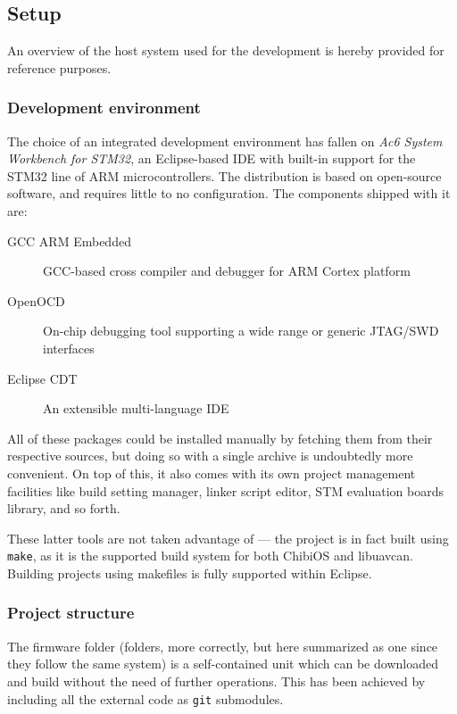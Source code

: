 \subsection{Setup}\label{subsec:sw_setup}
An overview of the host system used for the development is hereby provided for reference purposes.



\subsubsection{Development environment}
The choice of an integrated development environment has fallen on \emph{Ac6 System Workbench for STM32}, an Eclipse-based IDE with built-in support for the STM32 line of ARM microcontrollers.
The distribution is based on open-source software, and requires little to no configuration.
The components shipped with it are:
\begin{description}
    \item[GCC ARM Embedded] GCC-based cross compiler and debugger for ARM Cortex platform
    \item[OpenOCD] On-chip debugging tool supporting a wide range or generic JTAG/SWD interfaces
    \item[Eclipse CDT] An extensible multi-language IDE
\end{description}
All of these packages could be installed manually by fetching them from their respective sources, but doing so with a single archive is undoubtedly more convenient.
On top of this, it also comes with its own project management facilities like build setting manager, linker script editor, STM evaluation boards library, and so forth.

These latter tools are not taken advantage of --- the project is in fact built using \texttt{make}, as it is the supported build system for both ChibiOS and libuavcan.
Building projects using makefiles is fully supported within Eclipse.




\subsubsection{Project structure}
The firmware folder (folders, more correctly, but here summarized as one since they follow the same system) is a self-contained unit which can be downloaded and build without the need of further operations.
This has been achieved by including all the external code as \texttt{git} submodules.



